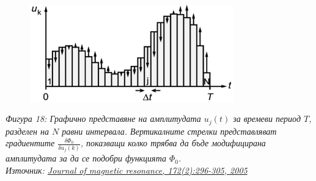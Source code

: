     \begin{figure}[H]
        \centering
        \includegraphics[width=250pt]{13.png}
    \end{figure}
    \begin{center}
        \small \textit{Фигура 18: Графично представяне на амплитудата $u_j(t)$ за времеви период $T$, разделен на $N$ равни интервала. Вертикалните стрелки представляват градиентите $\frac{\delta\Phi_0}{\delta u_j(k)}$, показващи колко трябва да бъде модифицирана амплитудата за да се подобри функцията $\Phi_0$.\\
        Източник: \href{https://www.sciencedirect.com/science/article/abs/pii/S1090780704003696}{Journal of magnetic resonance, 172(2):296-305, 2005}} \cite{khaneja2005optimal}
    \end{center}
